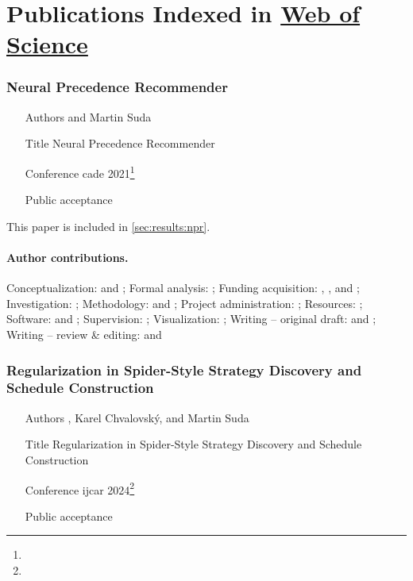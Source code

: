 \newpage

\section{Publications Indexed in \href{https://www.webofscience.com/}{Web of Science}}
\label{sec:wos}

\subsubsection{Neural Precedence Recommender}

\begin{itemize}
\item[Authors]  and Martin Suda
\item[Title] Neural Precedence Recommender \cite{DBLP:conf/cade/Bartek021}
\item[Conference] \Acrfull{cade} 2021\footnote{}
\item[Public acceptance] 
\end{itemize}

This paper is included in \cref{sec:results:npr}.

\paragraph{Author contributions.}
Conceptualization:            \MS{} and \FB{};
Formal analysis:              \FB{};
Funding acquisition:          \MS{}, \FB{}, and \JU{};
Investigation:                \FB{};
Methodology:                  \FB{} and \MS{};
Project administration:       \MS{};
Resources:                    \JU{};
Software:                     \FB{} and \MS{};
Supervision:                  \MS{};
Visualization:                \FB{};
Writing -- original draft:    \FB{} and \MS{};
Writing -- review \& editing: \FB{} and \MS{}

\subsubsection{Regularization in Spider-Style Strategy Discovery and Schedule Construction}

\begin{itemize}
\item[Authors] , Karel Chvalovský, and Martin Suda
\item[Title] Regularization in Spider-Style Strategy Discovery and Schedule Construction \cite{DBLP:conf/ijcar/BartekCS24}
\item[Conference] \Acrfull{ijcar} 2024\footnote{}
\item[Public acceptance] 
\end{itemize}

